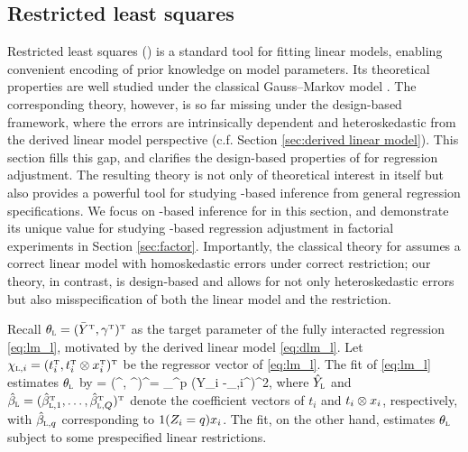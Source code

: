 \documentclass[11pt]{article}
\theoremstyle{definition}
\begin{document}
\subsection{Restricted least squares}\label{sec:rols_trt_overview}
Restricted least squares (\rols) is a standard tool for fitting linear models, enabling convenient encoding of prior knowledge on model parameters.
Its theoretical properties are well studied under the classical Gauss--Markov model \citep{theil, rao, greene}.  
The corresponding theory, however, is so far missing under the design-based framework,  where the errors are intrinsically dependent and heteroskedastic from the derived linear model perspective (c.f. Section \ref{sec:derived linear model}). 
This section fills this gap, and clarifies the design-based properties of \rlss for regression adjustment. 
The resulting theory is not only of theoretical interest in itself but also provides a powerful tool for studying \ols-based inference from general regression specifications. 
We focus on \rols-based inference for \mess in this section, and demonstrate its unique value for studying \ols-based regression adjustment in factorial experiments in Section \ref{sec:factor}. 
Importantly, the classical theory for \rlss assumes a correct linear model with homoskedastic errors under correct restriction; our theory, in contrast, is design-based and allows for not only heteroskedastic errors but also misspecification of both the linear model and the restriction.

Recall $\theta_{\textsc{l}} = (\bar Y^{ \mathrm{\scriptscriptstyle T} },\gamma^{ \mathrm{\scriptscriptstyle T} })^{ \mathrm{\scriptscriptstyle T} }$ as the target parameter of  the fully interacted regression \eqref{eq:lm_l}, motivated by the derived linear model \eqref{eq:dlm_l}. 
Let $\chi_{\textsc{l},i} = ( t_i^{ \mathrm{\scriptscriptstyle T} },t_i^{ \mathrm{\scriptscriptstyle T} } \otimes x_i^{ \mathrm{\scriptscriptstyle T} }  )^{ \mathrm{\scriptscriptstyle T} }$ be the regressor vector of \eqref{eq:lm_l}. 
The \olss fit of \eqref{eq:lm_l}  estimates $\theta_{\textsc{l}}$ by
\begina
\hthl = (\hyl^\T, \hbl^\T)^\T= \argmin_{\theta \in {}^p} \sumi (Y_i -\chi_{\lin,i}^\T \theta)^2,
\enda 
where $\hat Y_{\textsc{l}}$ and $\hat\beta_{\textsc{l}} = (\hat\beta_{\textsc{l},1}^{ \mathrm{\scriptscriptstyle T} }, \dots, \hat\beta_{\textsc{l},Q}^{ \mathrm{\scriptscriptstyle T} })^{ \mathrm{\scriptscriptstyle T} }$ denote the coefficient vectors of $t_i$ and $t_i \otimes x_i$, respectively, with $\hat\beta_{\textsc{l},q}$ corresponding to  $1(Z_i=q) x_i $. 
The \rlss fit, on the other hand, estimates $\theta_{\textsc{l}}$ subject to some prespecified linear restrictions.
\end{document}
